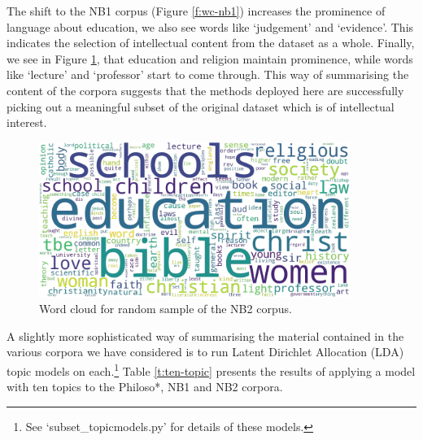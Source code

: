\documentclass{article}
\begin{document}
The shift to the NB1 corpus (Figure \ref{f:wc-nb1}) increases the prominence of language about education, we also see words like `judgement' and `evidence'. This indicates the selection of intellectual content from the dataset as a whole. Finally, we see in Figure \ref{f:wc-nb2}, that education and religion maintain prominence, while words like `lecture' and `professor' start to come through. This way of summarising the content of the corpora suggests that the methods deployed here are successfully picking out a meaningful subset of the original dataset which is of intellectual interest.

\begin{figure}
  \centering
  \includegraphics[width=0.9\textwidth]{images/nb2_v2_philoso_tf-idf.png}
  \caption{Word cloud for random sample of the NB2 corpus.}
  \label{f:wc-nb2}
\end{figure}


A slightly more sophisticated way of summarising the material contained in the various corpora we have considered is to run Latent Dirichlet Allocation (LDA) topic models on each.\footnote{
See `subset\_\-topicmodels.py' for details of these models.
} Table \ref{t:ten-topic} presents the results of applying a model with ten topics to the Philoso*, NB1 and NB2 corpora.
\end{document}
